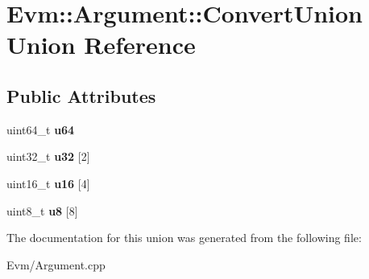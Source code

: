 \hypertarget{union_evm_1_1_argument_1_1_convert_union}{}\section{Evm\+:\+:Argument\+:\+:Convert\+Union Union Reference}
\label{union_evm_1_1_argument_1_1_convert_union}
\subsection*{Public Attributes}
\begin{DoxyCompactItemize}
\item 
\mbox{\label{union_evm_1_1_argument_1_1_convert_union_af260a152260e9dce301b3c2256b2f5ce}} 
uint64\+\_\+t {\bfseries u64}
\item 
\mbox{\label{union_evm_1_1_argument_1_1_convert_union_abe47d441d4b7958434093b7c204fffd4}} 
uint32\+\_\+t {\bfseries u32} \mbox{[}2\mbox{]}
\item 
\mbox{\label{union_evm_1_1_argument_1_1_convert_union_ac9dc1da78775f62b92dbca1c0861ef2a}} 
uint16\+\_\+t {\bfseries u16} \mbox{[}4\mbox{]}
\item 
\mbox{\label{union_evm_1_1_argument_1_1_convert_union_a40fe62a842931fcd9a0ac406dedf6686}} 
uint8\+\_\+t {\bfseries u8} \mbox{[}8\mbox{]}
\end{DoxyCompactItemize}


The documentation for this union was generated from the following file\+:\begin{DoxyCompactItemize}
\item 
Evm/Argument.\+cpp\end{DoxyCompactItemize}
